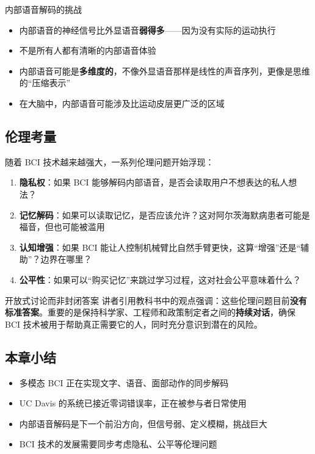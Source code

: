 \begin{warningbox}{内部语音解码的挑战}
\begin{itemize}
    \item 内部语音的神经信号比外显语音\textbf{弱得多}——因为没有实际的运动执行
    \item 不是所有人都有清晰的内部语音体验
    \item 内部语音可能是\textbf{多维度的}，不像外显语音那样是线性的声音序列，更像是思维的``压缩表示''
    \item 在大脑中，内部语音可能涉及比运动皮层更广泛的区域
\end{itemize}
\end{warningbox}

\subsection{伦理考量}

随着 BCI 技术越来越强大，一系列伦理问题开始浮现：

\begin{enumerate}
    \item \textbf{隐私权}：如果 BCI 能够解码内部语音，是否会读取用户不想表达的私人想法？
    \item \textbf{记忆解码}：如果可以读取记忆，是否应该允许？这对阿尔茨海默病患者可能是福音，但也可能被滥用
    \item \textbf{认知增强}：如果 BCI 能让人控制机械臂比自然手臂更快，这算``增强''还是``辅助''？边界在哪里？
    \item \textbf{公平性}：如果可以``购买记忆''来跳过学习过程，这对社会公平意味着什么？
\end{enumerate}

\begin{knowledgebox}{开放式讨论而非封闭答案}
讲者引用教科书中的观点强调：这些伦理问题目前\textbf{没有标准答案}。重要的是保持科学家、工程师和政策制定者之间的\textbf{持续对话}，确保 BCI 技术被用于帮助真正需要它的人，同时充分意识到潜在的风险。
\end{knowledgebox}

\subsection{本章小结}

\begin{itemize}
    \item 多模态 BCI 正在实现文字、语音、面部动作的同步解码
    \item UC Davis 的系统已接近零词错误率，正在被参与者日常使用
    \item 内部语音解码是下一个前沿方向，但信号弱、定义模糊，挑战巨大
    \item BCI 技术的发展需要同步考虑隐私、公平等伦理问题
\end{itemize}


